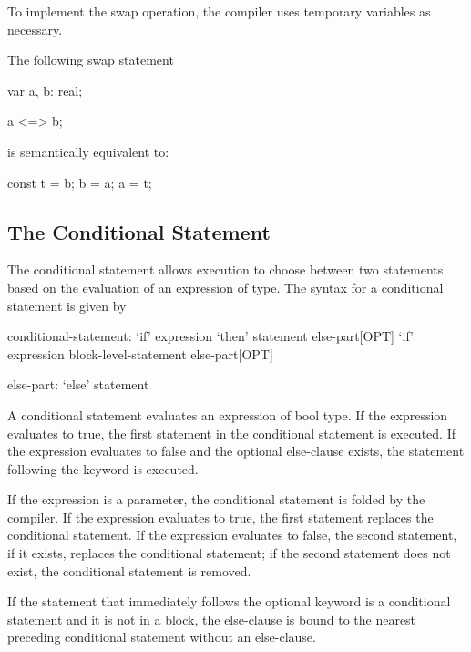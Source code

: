 To implement the swap operation, the compiler uses temporary variables
as necessary.

\begin{example}
The following swap statement
\begin{chapel}
var a, b: real;

a <=> b;
\end{chapel}
is semantically equivalent to:
\begin{chapel}
const t = b;
b = a;
a = t;
\end{chapel}
\end{example}

\subsection{The Conditional Statement}
\label{The_Conditional_Statement}

The conditional statement allows execution to choose between two
statements based on the evaluation of an expression of 
type. The syntax for a conditional statement is given by
\begin{syntax}
conditional-statement:
  `if' expression `then' statement else-part[OPT]
  `if' expression block-level-statement else-part[OPT]

else-part:
  `else' statement
\end{syntax}

A conditional statement evaluates an expression of bool type. If the
expression evaluates to true, the first statement in the conditional
statement is executed.  If the expression evaluates to false and the
optional else-clause exists, the statement following the
 keyword is executed.

If the expression is a parameter, the conditional statement is folded
by the compiler. If the expression evaluates to true, the first
statement replaces the conditional statement. If the expression
evaluates to false, the second statement, if it exists, replaces the
conditional statement; if the second statement does not exist, the
conditional statement is removed.

If the statement that immediately follows the optional 
keyword is a conditional statement and it is not in a block, the
else-clause is bound to the nearest preceding conditional statement
without an else-clause.

